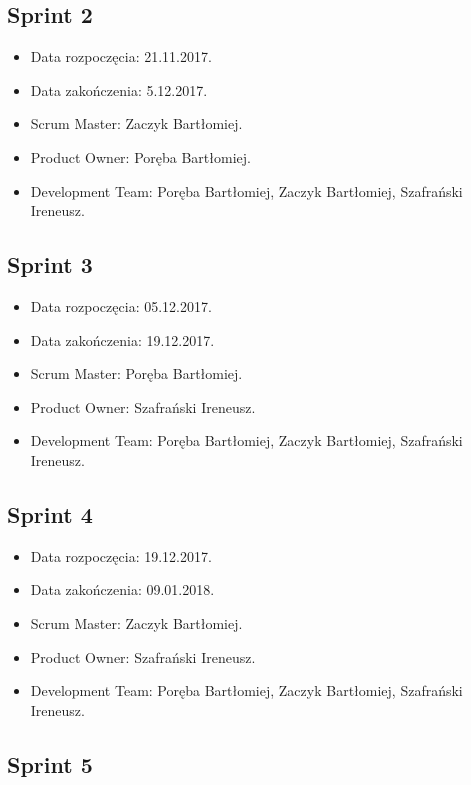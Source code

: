 \documentclass[a4paper]{article}
\begin{document}
	\subsection{Sprint 2}
	
	\begin{itemize}
		\item Data rozpoczęcia: 21.11.2017.
		\item  Data zakończenia: 5.12.2017.
		\item Scrum Master: Zaczyk Bartłomiej.
		\item Product Owner: Poręba Bartłomiej.
		\item Development Team: Poręba Bartłomiej, Zaczyk Bartłomiej, Szafrański Ireneusz.
	\end{itemize}
	
	\subsection{Sprint 3}
	
	\begin{itemize}
		\item Data rozpoczęcia: 05.12.2017.
		\item  Data zakończenia: 19.12.2017.
		\item Scrum Master: Poręba Bartłomiej.
		\item Product Owner: Szafrański Ireneusz.
		\item Development Team: Poręba Bartłomiej, Zaczyk Bartłomiej, Szafrański Ireneusz.
	\end{itemize}
	
	\subsection{Sprint 4}
	
	\begin{itemize}
		\item Data rozpoczęcia: 19.12.2017.
		\item  Data zakończenia: 09.01.2018.
		\item Scrum Master: Zaczyk Bartłomiej.
		\item Product Owner: Szafrański Ireneusz.
		\item Development Team: Poręba Bartłomiej, Zaczyk Bartłomiej, Szafrański Ireneusz.
	\end{itemize}
	
	\subsection{Sprint 5}
	
\end{document}
